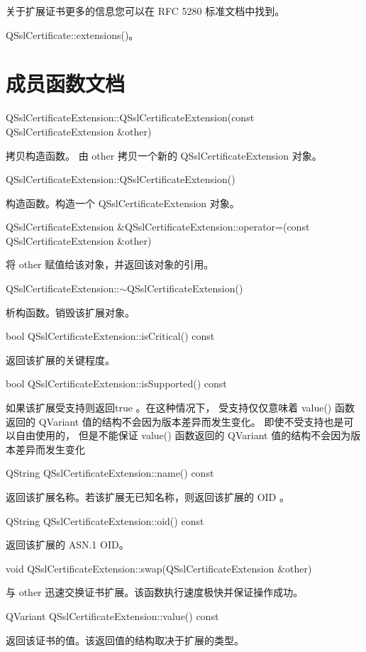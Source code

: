 关于扩展证书更多的信息您可以在 RFC 5280 标准文档中找到。

\begin{seeAlso}
QSslCertificate::extensions()。
\end{seeAlso}


\section{成员函数文档}

QSslCertificateExtension::QSslCertificateExtension(const QSslCertificateExtension \&other)

拷贝构造函数。
由 other 拷贝一个新的 QSslCertificateExtension 对象。

QSslCertificateExtension::QSslCertificateExtension()

构造函数。构造一个 QSslCertificateExtension 对象。

QSslCertificateExtension \&QSslCertificateExtension::operator=(const QSslCertificateExtension \&other)

将 other 赋值给该对象，并返回该对象的引用。

QSslCertificateExtension::$\sim$QSslCertificateExtension()

析构函数。销毁该扩展对象。

bool QSslCertificateExtension::isCritical() const

返回该扩展的关键程度。

bool QSslCertificateExtension::isSupported() const

如果该扩展受支持则返回true 。在这种情况下，
受支持仅仅意味着 value() 函数返回的 QVariant 值的结构不会因为版本差异而发生变化。
即使不受支持也是可以自由使用的，
但是不能保证 value() 函数返回的 QVariant 值的结构不会因为版本差异而发生变化

QString QSslCertificateExtension::name() const

返回该扩展名称。若该扩展无已知名称，则返回该扩展的 OID 。

QString QSslCertificateExtension::oid() const

返回该扩展的 ASN.1 OID。

void QSslCertificateExtension::swap(QSslCertificateExtension \&other)

与 other 迅速交换证书扩展。该函数执行速度极快并保证操作成功。

QVariant QSslCertificateExtension::value() const

返回该证书的值。该返回值的结构取决于扩展的类型。